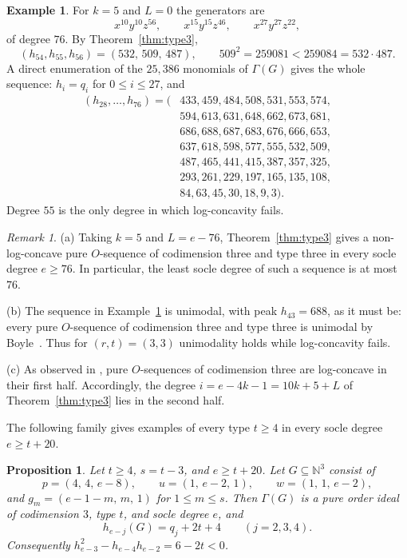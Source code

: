 \documentclass{amsart}
\newtheorem{proposition}[theorem]{Proposition}
\theoremstyle{definition}
\newtheorem{example}[theorem]{Example}
\theoremstyle{remark}
\newtheorem{remark}[theorem]{Remark}
\newcommand{\N}{\mathbb{N}}
\begin{document}
\begin{example}\label{ex:76}
For $k=5$ and $L=0$ the generators are
\[
x^{10}y^{10}z^{56},\qquad x^{15}y^{15}z^{46},\qquad x^{27}y^{27}z^{22},
\]
of degree $76$. By Theorem~\ref{thm:type3},
\[
(h_{54},h_{55},h_{56})=(532,\,509,\,487),\qquad 509^2=259081<259084=532\cdot 487.
\]
A direct enumeration of the $25{,}386$ monomials of $\Gamma(G)$ gives the whole sequence: $h_i=q_i$ for $0\le i\le 27$, and
\begin{align*}
(h_{28},\dots,h_{76})=(&433, 459, 484, 508, 531, 553, 574,\\
&594, 613, 631, 648, 662, 673, 681,\\
&686, 688, 687, 683, 676, 666, 653,\\
&637, 618, 598, 577, 555, 532, 509,\\
&487, 465, 441, 415, 387, 357, 325,\\
&293, 261, 229, 197, 165, 135, 108,\\
&84, 63, 45, 30, 18, 9, 3).
\end{align*}
Degree $55$ is the only degree in which log-concavity fails.
\end{example}

\begin{remark}\label{rem:type3}
(a) Taking $k=5$ and $L=e-76$, Theorem~\ref{thm:type3} gives a non-log-concave pure $O$-sequence of codimension three and type three in every socle degree $e\ge 76$. In particular, the least socle degree of such a sequence is at most $76$.

(b) The sequence in Example~\ref{ex:76} is unimodal, with peak $h_{43}=688$, as it must be: every pure $O$-sequence of codimension three and type three is unimodal by Boyle~\cite{Bo14}. Thus for $(r,t)=(3,3)$ unimodality holds while log-concavity fails.

(c) As observed in \cite[Question~9(1)]{Za}, pure $O$-sequences of codimension three are log-concave in their first half. Accordingly, the degree $i=e-4k-1=10k+5+L$ of Theorem~\ref{thm:type3} lies in the second half.
\end{remark}

The following family gives examples of every type $t\ge 4$ in every socle degree $e\ge t+20$.

\begin{proposition}\label{prop:three-variables}
Let $t\ge 4$, $s=t-3$, and $e\ge t+20$. Let $G\subseteq\N^3$ consist of
\[
p=(4,\,4,\,e-8),\qquad u=(1,\,e-2,\,1),\qquad w=(1,\,1,\,e-2),
\]
and $g_m=(e-1-m,\,m,\,1)$ for $1\le m\le s$. Then $\Gamma(G)$ is a pure order ideal of codimension $3$, type $t$, and socle degree $e$, and
\[
h_{e-j}(G)=q_j+2t+4\qquad (j=2,3,4).
\]
Consequently $h_{e-3}^2-h_{e-4}h_{e-2}=6-2t<0$.
\end{proposition}
\end{document}
